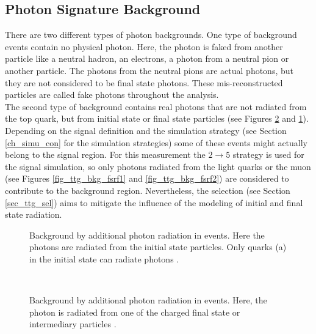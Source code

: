 \FloatBarrier
\subsection{Photon Signature Background}


There are two different types of photon backgrounds. One type of background events contain no physical photon. Here, the photon is faked from another particle like a neutral hadron, an electrons, a photon from a neutral pion or another particle. The photons from the neutral pions are actual photons, but they are not considered to be final state photons. These mis-reconstructed particles are called fake photons throughout the analysis. \\
The second type of background contains real photons that are not radiated from the top quark, but from initial state or final state particles (see Figures \ref{fig_ttg_bkg_fsr} and \ref{fig_ttg_bkg_isr}). Depending on the signal definition and the simulation strategy (see Section \ref{ch_simu_con} for the simulation strategies) some of these events might actually belong to the signal region. For this measurement the $2 \to 5$ strategy is used for the signal simulation, so only photons radiated from the light quarks or the muon (see Figures \ref{fig_ttg_bkg_fsrf1} and \ref{fig_ttg_bkg_fsrf2}) are considered to contribute to the background region. Nevertheless, the selection (see Section \ref{sec_ttg_sel}) aims to mitigate the influence of the modeling of initial and final state radiation.

\begin{figure}[ht]
  \caption{Background by additional photon radiation in \ttbar events. Here the photons are radiated from the initial state particles. Only quarks (a) in the initial state can radiate photons \cite{Hermanns:1292768}.}
  \label{fig_ttg_bkg_isr}
\end{figure}

\begin{figure}[ht]
 \\
  \caption{Background by additional photon radiation in \ttbar events. Here, the photon is radiated from one of the charged final state or intermediary particles \cite{tholen:ma,Hermanns:1292768}.}
  \label{fig_ttg_bkg_fsr}
\end{figure}



